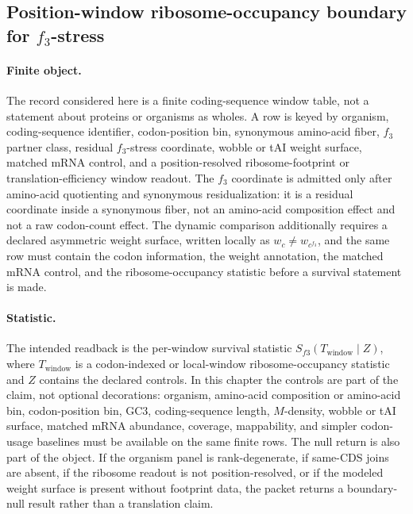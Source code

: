 \subsection{Position-window ribosome-occupancy boundary for $f_3$-stress}\label{sec:q6-f3-stress-position-window-ribosome-occupancy-translation-boundary}

\paragraph{Finite object.}
The record considered here is a finite coding-sequence window table, not a statement about proteins or organisms as wholes.  A row is keyed by organism, coding-sequence identifier, codon-position bin, synonymous amino-acid fiber, $f_3$ partner class, residual $f_3$-stress coordinate, wobble or tAI weight surface, matched mRNA control, and a position-resolved ribosome-footprint or translation-efficiency window readout.  The $f_3$ coordinate is admitted only after amino-acid quotienting and synonymous residualization: it is a residual coordinate inside a synonymous fiber, not an amino-acid composition effect and not a raw codon-count effect.  The dynamic comparison additionally requires a declared asymmetric weight surface, written locally as $w_c \neq w_{c^{f_3}}$, and the same row must contain the codon information, the weight annotation, the matched mRNA control, and the ribosome-occupancy statistic before a survival statement is made.

\paragraph{Statistic.}
The intended readback is the per-window survival statistic $S_{f3}(T_{\mathrm{window}}\mid Z)$, where $T_{\mathrm{window}}$ is a codon-indexed or local-window ribosome-occupancy statistic and $Z$ contains the declared controls.  In this chapter the controls are part of the claim, not optional decorations: organism, amino-acid composition or amino-acid bin, codon-position bin, GC3, coding-sequence length, $M$-density, wobble or tAI surface, matched mRNA abundance, coverage, mappability, and simpler codon-usage baselines must be available on the same finite rows.  The null return is also part of the object.  If the organism panel is rank-degenerate, if same-CDS joins are absent, if the ribosome readout is not position-resolved, or if the modeled weight surface is present without footprint data, the packet returns a boundary-null result rather than a translation claim.

